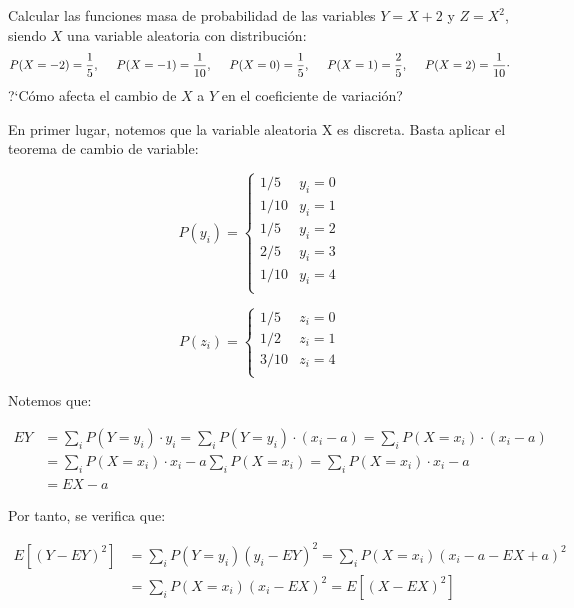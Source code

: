 \problem
Calcular las funciones masa de probabilidad de las
variables $Y = X + 2$ y $Z = X^{2}$, siendo $X$ una variable aleatoria  con
distribuci{\'o}n:
$$
P(X=-2)= \displaystyle\frac{1}{5}, \hskip 0.5cm P(X=-1)=
\displaystyle\frac{1}{10}, \hskip 0.5cm P(X=0)= \displaystyle\frac{1}{5},
\hskip 0.5cm P(X=1)= \displaystyle\frac{2}{5}, \hskip 0.5cm P(X=2)=
\displaystyle\frac{1}{10}\cdot
$$
?`C{\'o}mo afecta el cambio de $X$ a $Y$ en el coeficiente de variaci{\'o}n?

En primer lugar, notemos que la variable aleatoria X es discreta. Basta aplicar el teorema de cambio de variable:

\begin{equation*}
P(y_i) = \left\{ \begin{array}{lcc}
1/5   & y_i = 0 \\
1/10  & y_i = 1 \\
1/5   & y_i = 2 \\
2/5   & y_i = 3 \\
1/10  & y_i = 4 \\
\end{array}
\right.
\end{equation*}

\begin{equation*}
P(z_i) = \left\{ \begin{array}{lcc}
1/5   & z_i = 0 \\
1/2   & z_i = 1 \\
3/10  & z_i = 4 \\
\end{array}
\right.
\end{equation*}

Notemos que:

\begin{equation*}
\begin{split}
EY & = \sum_i P(Y=y_i)·y_i = \sum_i P(Y=y_i)·(x_i - a) = \sum_i P(X=x_i)·(x_i - a) \\
& = \sum_i P(X=x_i)·x_i - a\sum_i P(X=x_i) = \sum_i P(X=x_i)·x_i - a \\
& = EX - a
\end{split}
\end{equation*}

Por tanto, se verifica que: 

\begin{equation*}
\begin{split}
E[(Y-EY)^2] & = \sum_i P(Y=y_i)(y_i - EY)^2 = \sum_i P(X=x_i)(x_i - a - EX + a)^2 \\
& = \sum_i P(X=x_i)(x_i - EX)^2 = E[(X-EX)^2]
\end{split}
\end{equation*}

